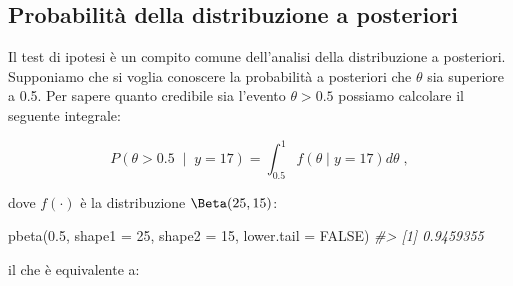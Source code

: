 \documentclass[
  11pt,
  italian,
  a4paper,
  extrafontsizes,onecolumn,openright
  ]{memoir}
\newenvironment{Shaded}{\begin{snugshade}}{\end{snugshade}}
\newcommand{\AttributeTok}[1]{\textcolor[rgb]{0.77,0.63,0.00}{#1}}
\newcommand{\CommentTok}[1]{\textcolor[rgb]{0.56,0.35,0.01}{\textit{#1}}}
\newcommand{\ConstantTok}[1]{\textcolor[rgb]{0.00,0.00,0.00}{#1}}
\newcommand{\ControlFlowTok}[1]{\textcolor[rgb]{0.13,0.29,0.53}{\textbf{#1}}}
\newcommand{\DecValTok}[1]{\textcolor[rgb]{0.00,0.00,0.81}{#1}}
\newcommand{\FloatTok}[1]{\textcolor[rgb]{0.00,0.00,0.81}{#1}}
\newcommand{\FunctionTok}[1]{\textcolor[rgb]{0.00,0.00,0.00}{#1}}
\newcommand{\NormalTok}[1]{#1}
\newcommand{\OtherTok}[1]{\textcolor[rgb]{0.56,0.35,0.01}{#1}}
\newcommand{\SpecialCharTok}[1]{\textcolor[rgb]{0.00,0.00,0.00}{#1}}
\begin{document}
\hypertarget{probabilituxe0-della-distribuzione-a-posteriori}{%
\subsection{Probabilità della distribuzione a posteriori}\label{probabilituxe0-della-distribuzione-a-posteriori}}

Il test di ipotesi è un compito comune dell'analisi della distribuzione a posteriori. Supponiamo che si voglia conoscere la probabilità a posteriori che \(\theta\) sia superiore a 0.5. Per sapere quanto credibile sia l'evento \(\theta > 0.5\) possiamo calcolare il seguente integrale:

\[
P(\theta > 0.5 \; \mid \; y = 17) = \int_{0.5}^{1}f(\theta \mid y=17)d\theta \;,
\]

\noindent
dove \(f(\cdot)\) è la distribuzione \(\mbox{\Beta}(25, 15)\):

\begin{Shaded}
\begin{Highlighting}[]
\FunctionTok{pbeta}\NormalTok{(}\FloatTok{0.5}\NormalTok{, }\AttributeTok{shape1 =} \DecValTok{25}\NormalTok{, }\AttributeTok{shape2 =} \DecValTok{15}\NormalTok{, }\AttributeTok{lower.tail =} \ConstantTok{FALSE}\NormalTok{)}
\CommentTok{\#\textgreater{} [1] 0.9459355}
\end{Highlighting}
\end{Shaded}

\noindent
il che è equivalente a:

\begin{Shaded}
\end{Shaded}
\end{document}
